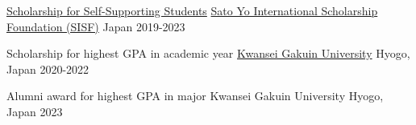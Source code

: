 
\begin{cvhonors}

  \cvhonor
    {\href{https://sisf.or.jp/en/scholarship-2/foreign-studies-2/self-supporting/}{Scholarship for Self-Supporting Students}} %
    {\href{https://sisf.or.jp/en/}{Sato Yo International Scholarship Foundation (SISF)}} %
    {Japan} %
    {2019-2023} %

  \cvhonor
    {Scholarship for highest GPA in academic year} %
    {\href{https://global.kwansei.ac.jp/}{Kwansei Gakuin University}} %
    {Hyogo, Japan} %
    {2020-2022} %

  \cvhonor
    {Alumni award for highest GPA in major} %
    {Kwansei Gakuin University} %
    {Hyogo, Japan} %
    {2023} %

\end{cvhonors}
